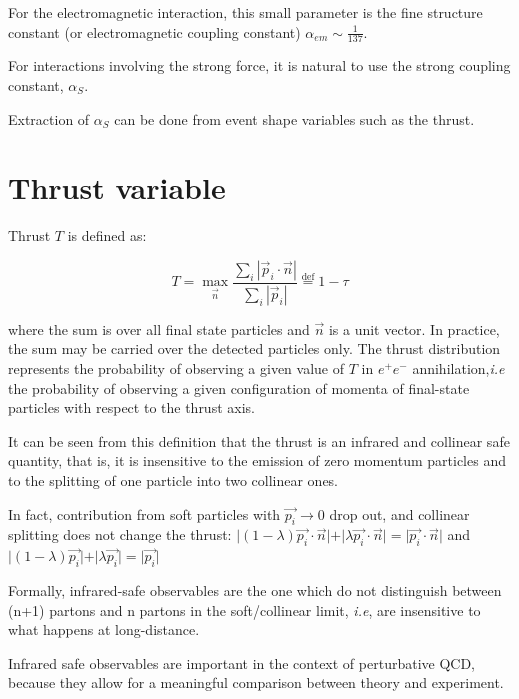 \documentclass[../main.tex]{subfiles}
\begin{document}
For the electromagnetic interaction, this small parameter is the fine structure constant (or electromagnetic coupling constant) $\alpha_{em} \sim \frac{1}{137}$.

For interactions involving the strong force, it is natural to use the strong coupling constant, $\alpha_S$.

Extraction of $\alpha_S$ can be done from event shape variables such as the thrust.


\section{Thrust variable}\label{sec:Thrust}

Thrust $T$ is defined as:

\begin{equation} \label{eq:Thrust}
    T = \max_{\vec{n}} \frac{\sum_i |\vec{p}_i \cdot \vec{n}|}{\sum_i |\vec{p}_i|} \stackrel{\text{def}}{=} 1-\tau
\end{equation}

where the sum is over all final state particles and $\vec{n}$ is a unit vector.
In practice, the sum may be carried over the detected particles only. 
The thrust distribution represents the probability of observing a given value of $T$ in $e^+e^-$ annihilation,\emph{i.e} the probability of observing a given configuration of momenta of final-state particles 
with respect to the thrust axis.  

It can be seen from this definition that the thrust is an infrared and collinear safe quantity, that is, it is insensitive to the emission of zero momentum particles and to the splitting of 
one particle into two collinear ones.

In fact, contribution from soft particles with $\vec{p_i}\to 0$ drop out, and collinear splitting does not change the thrust:
$\vert (1-\lambda)\vec{p_i}\cdot \vec{n} \vert + \vert \lambda \vec{p_i}\cdot \vec{n}\vert = \vert \vec{p_i}\cdot \vec{n} \vert$ and 
$\vert (1-\lambda)\vec{p_i} \vert + \vert \lambda \vec{p_i}\vert = \vert \vec{p_i} \vert$

Formally, infrared-safe observables are the one which do not distinguish between (n+1) partons and n partons in the soft/collinear limit, \emph{i.e},
are insensitive to what happens at long-distance.

Infrared safe observables are important in the context of perturbative QCD, because they allow for a meaningful comparison between theory and experiment. 
\end{document}
